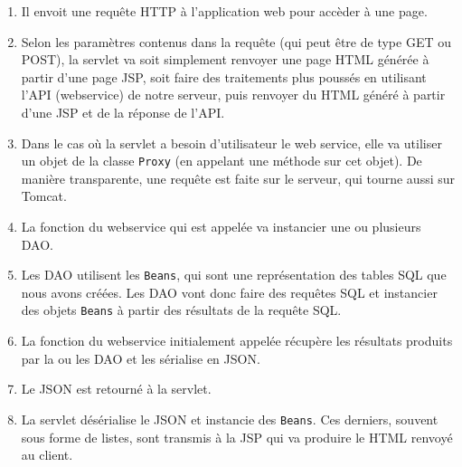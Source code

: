 \begin{enumerate}
  \item Il envoit une requête HTTP à l'application web pour accèder à une page.
  \item Selon les paramètres contenus dans la requête (qui peut être de type GET ou POST), la servlet va soit simplement renvoyer une page HTML générée à partir d'une page JSP, soit faire des traitements plus poussés en utilisant l'API (webservice) de notre serveur, puis renvoyer du HTML généré à partir d'une JSP et de la réponse de l'API.
  \item Dans le cas où la servlet a besoin d'utilisateur le web service, elle va utiliser un objet de la classe \lstinline{Proxy} (en appelant une méthode sur cet objet). De manière transparente, une requête est faite sur le serveur, qui tourne aussi sur Tomcat.
  \item La fonction du webservice qui est appelée va instancier une ou plusieurs DAO.
  \item Les DAO utilisent les \lstinline{Beans}, qui sont une représentation des tables SQL que nous avons créées. Les DAO vont donc faire des requêtes SQL et instancier des objets \lstinline{Beans} à partir des résultats de la requête SQL.
  \item La fonction du webservice initialement appelée récupère les résultats produits par la ou les DAO et les sérialise en JSON.
  \item Le JSON est retourné à la servlet.
  \item La servlet désérialise le JSON et instancie des \lstinline{Beans}. Ces derniers, souvent sous forme de listes, sont transmis à la JSP qui va produire le HTML renvoyé au client.
\end{enumerate}
